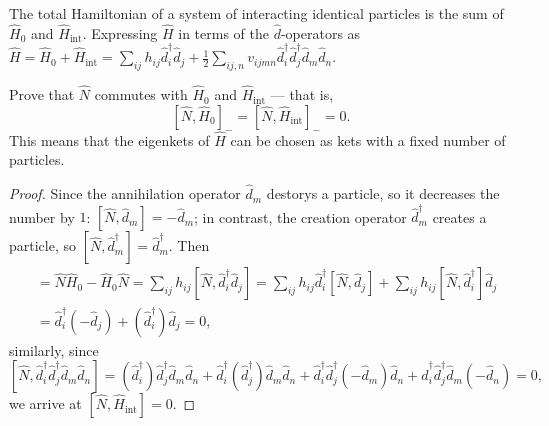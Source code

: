 \begin{framed}
  \justifying \noindent
  The total Hamiltonian of a system of interacting identical particles
  is the sum of $\hat H_0$ and $\hat H_\text{int}$.
  Expressing $\hat H$ in terms of the $\hat d$-operators as
  $\hat H = \hat H_0 + \hat H_\text{int}
  = \sum_{ij} h_{ij} \hat d_i^\dagger \hat d_j
  + \frac12 \sum_{ij,n} v_{ijmn} \hat d_i^\dagger \hat d_j^\dagger
    \hat d_m \hat d_n$.
\end{framed}
\begin{problem}
  Prove that $\hat N$ commutes with $\hat H_0$ and $\hat H_\text{int}$ ---
  that is,
  \[
    [\hat N, \hat H_0]_- = [\hat N, \hat H_\text{int}]_- = 0.
  \]
  This means that the eigenkets of $\hat H$
  can be chosen as kets with a fixed number of particles.
\end{problem}
\begin{solution}
\begin{proof}
  Since the annihilation operator $\hat d_m$ destorys a particle,
  so it decreases the number by $1$: $[\hat N, \hat d_m] = -\hat d_m$;
  in contrast, the creation operator $\hat d_m^\dagger$ creates a particle,
  so $[\hat N, \hat d_m^\dagger] = \hat d_m^\dagger$. Then
  \begin{align*}
    [\hat N, \hat H_0] & = \hat N \hat H_0 - \hat H_0 \hat N
  = \sum_{ij} h_{ij} [\hat N, \hat d_i^\dagger \hat d_j]
  = \sum_{ij} h_{ij} \hat d_i^\dagger [\hat N, \hat d_j]
  + \sum_{ij} h_{ij} [\hat N, \hat d_i^\dagger]\hat d_j\\
  & = \hat d_i^\dagger (-\hat d_j) + (\hat d_i^\dagger) \hat d_j = 0,
  \end{align*}
  similarly, since
  \[
    [\hat N, \hat d_i^\dagger \hat d_j^\dagger \hat d_m \hat d_n]
  = (\hat d_i^\dagger) \hat d_j^\dagger \hat d_m \hat d_n
  + \hat d_i^\dagger (\hat d_j^\dagger) \hat d_m \hat d_n
  + \hat d_i^\dagger \hat d_j^\dagger (-\hat d_m) \hat d_n
  + \hat d_i^\dagger \hat d_j^\dagger \hat d_m (-\hat d_n) = 0,
  \]
  we arrive at $[\hat N, \hat H_\text{int}] = 0$.
\end{proof}
\end{solution}

